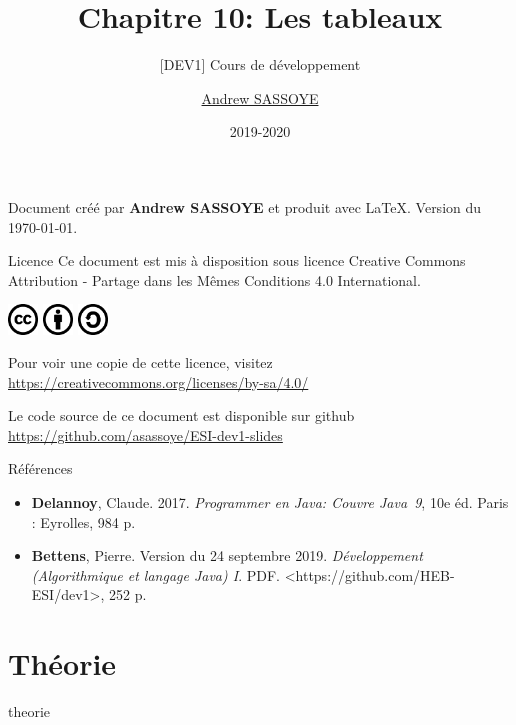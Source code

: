 \documentclass[utf8]{beamer}
\title{Chapitre 10: Les tableaux}
\subtitle{\tiny [DEV1] Cours de développement}
\author{\href{https://andrew.sassoye.be}{Andrew SASSOYE}}
\date{2019-2020}
\begin{document}
    \begin{frame}
        \titlepage
    \end{frame}

    \begin{frame}
        \center Document créé par \textbf{Andrew SASSOYE} et produit avec \LaTeX.
        \tiny Version du \today. \normalsize

        \begin{block}{Licence}
            Ce document est mis à disposition sous licence Creative Commons
            Attribution - Partage dans les Mêmes Conditions 4.0 International.

            \begin{center}
                \includegraphics[width=8mm]{./styles/images/cc}
                \includegraphics[width=8mm]{./styles/images/by}
                \includegraphics[width=8mm]{./styles/images/sa}
            \end{center}

            \center\tiny Pour voir une copie de cette licence, visitez
            \href{https://creativecommons.org/licenses/by-sa/4.0/}{https://creativecommons.org/licenses/by-sa/4.0/}
            \normalsize
        \end{block}

        \tiny Le code source de ce document est disponible sur github\\ \href{https://github.com/asassoye/ESI-dev1-slides}{https://github.com/asassoye/ESI-dev1-slides}

    \end{frame}

    \begin{frame}{Références}
        \begin{itemize}
            \item \textbf{Delannoy}, Claude. 2017. \textit{Programmer en Java: Couvre Java~9}, 10e éd. Paris : Eyrolles, 984 p.
            \item \textbf{Bettens}, Pierre. Version du 24 septembre 2019. \textit{Développement (Algorithmique et langage Java) I}. PDF. <https://github.com/HEB-ESI/dev1>, 252 p.
        \end{itemize}
    \end{frame}

    \part{Théorie}
        {theorie}
\end{document}
